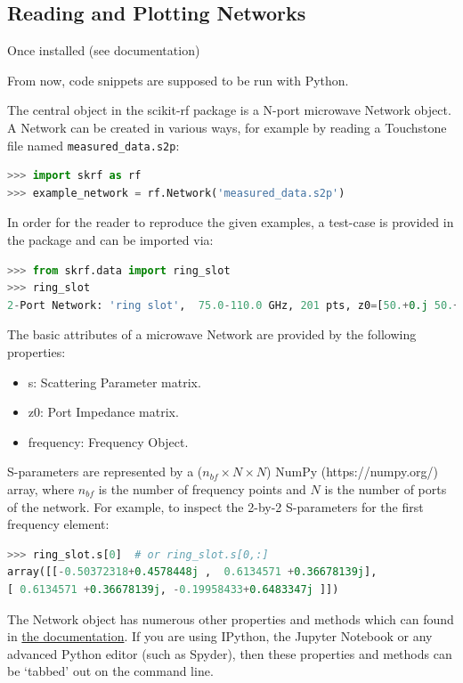 \documentclass{IEEEjmw}
\begin{document}
\subsection{Reading and Plotting Networks}

Once installed (see documentation)

From now, code snippets are supposed to be run with Python. 

The central object in the scikit-rf package is a N-port microwave Network object. A Network can be created in various ways, for example by reading a Touchstone file named \texttt{measured\_data.s2p}:

\begin{lstlisting}[language=Python]
>>> import skrf as rf
>>> example_network = rf.Network('measured_data.s2p')
\end{lstlisting}

In order for the reader to reproduce the given examples, a test-case is provided in the package and can be imported via:

\begin{lstlisting}[language=Python]
>>> from skrf.data import ring_slot
>>> ring_slot
2-Port Network: 'ring slot',  75.0-110.0 GHz, 201 pts, z0=[50.+0.j 50.+0.j]
\end{lstlisting}


The basic attributes of a microwave Network are provided by the following properties:
\begin{itemize}
\item s: Scattering Parameter matrix.
\item z0: Port Impedance matrix.
\item frequency: Frequency Object.
\end{itemize}

S-parameters are represented by a ($n_{bf} \times N \times N$) NumPy (https://numpy.org/) array, where $n_{bf}$ is the number of frequency points and $N$ is the number of ports of the network. For example, to inspect the 2-by-2 S-parameters for the first frequency element:

\begin{lstlisting}[language=Python]
>>> ring_slot.s[0]  # or ring_slot.s[0,:]
array([[-0.50372318+0.4578448j ,  0.6134571 +0.36678139j],
[ 0.6134571 +0.36678139j, -0.19958433+0.6483347j ]])
\end{lstlisting}

The Network object has numerous other properties and methods which can found in  \href{https://scikit-rf.readthedocs.io}{the documentation}. If you are using IPython, the Jupyter Notebook or any advanced Python editor (such as Spyder), then these properties and methods can be ‘tabbed’ out on the command line.
\end{document}
